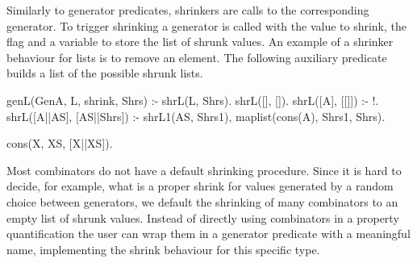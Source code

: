 Similarly to generator predicates, shrinkers are calls to the
corresponding generator.
%
To trigger shrinking a generator is called with the value to shrink, the
flag  and a variable to store the list of shrunk values.
%
An example of a shrinker behaviour for lists is to remove an
element.
%
The following auxiliary predicate builds a list of the possible shrunk
lists.
%
\begin{yapcode}
 genL(GenA, L, shrink, Shrs) :-  shrL(L, Shrs).
 shrL([], []).
 shrL([A], [[]]) :- !.
 shrL([A||AS], [AS||Shrs]) :-
   shrL1(AS, Shrs1), maplist(cons(A), Shrs1, Shrs).

 cons(X, XS, [X||XS]).
\end{yapcode}


Most combinators do not have a default shrinking procedure.
%
Since it is hard to decide, for example, what is a proper shrink for
values generated by a random choice between generators, we %
default
the shrinking of many combinators to an empty list of shrunk values.
%
Instead of directly using combinators in a property quantification
the user can wrap them in a generator predicate with a meaningful name,
implementing the shrink behaviour for this specific type.
